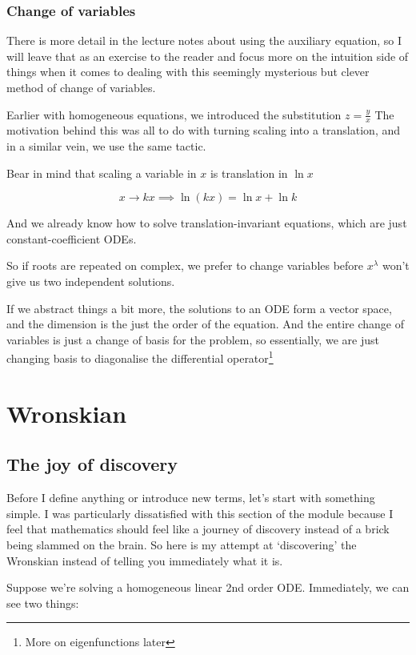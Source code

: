 \subsection{Change of variables}

There is more detail in the lecture notes about using the auxiliary equation, so I will leave that as an exercise to the reader and focus more on the intuition side of things when it comes to dealing with this seemingly mysterious but clever method of change of variables. 

Earlier with homogeneous equations, we introduced the substitution $z = \frac{y}{x}$ The motivation behind this was all to do with turning scaling into a translation, and in a similar vein, we use the same tactic. 

Bear in mind that scaling a variable in $x$ is translation in $\ln x$

$$
x \rightarrow kx \implies \ln (kx) = \ln x + \ln k
$$

And we already know how to solve translation-invariant equations, which are just constant-coefficient ODEs. 

So if roots are repeated on complex, we prefer to change variables before $x^{\lambda}$ won't give us two independent solutions. 

If we abstract things a bit more, the solutions to an ODE form a vector space, and the dimension is the just the order of the equation. And the entire change of variables is just a change of basis for the problem, so essentially, we are just changing basis to diagonalise the differential operator\footnote{More on eigenfunctions later}

\chapter{Wronskian}

\section{The joy of discovery}

Before I define anything or introduce new terms, let's start with something simple. I was particularly dissatisfied with this section of the module because I feel that mathematics should feel like a journey of discovery instead of a brick being slammed on the brain. So here is my attempt at `discovering' the Wronskian instead of telling you immediately what it is. 

Suppose we're solving a homogeneous linear 2nd order ODE. Immediately, we can see two things:

